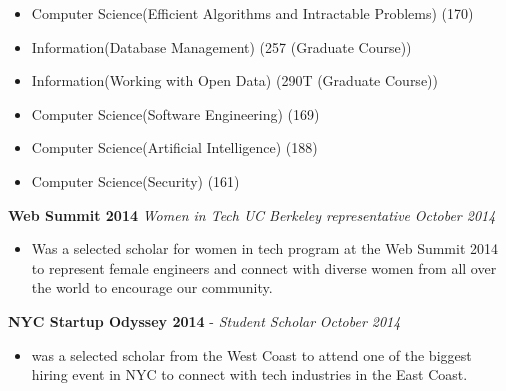 \documentclass[9pt]{extarticle}
\begin{document}
\begin{body}
\vspace{-11pt}
	
\begin{multicols}{3}
  \begin{itemize}
    \itemsep -2pt
    \item Computer Science(Efficient Algorithms and Intractable Problems) (170)
    \item Information(Database Management) (257 (Graduate Course))
    \item Information(Working with Open Data) (290T (Graduate Course))
    \item Computer Science(Software Engineering) (169)
    \item Computer Science(Artificial Intelligence) (188)
    \item Computer Science(Security) (161)
  \end{itemize}
\end{multicols}

\end{body}


\begin{body}

  \textbf{Web Summit 2014} 
  \emph{Women in Tech UC Berkeley representative}
  \hfill 
  \emph{October 2014}
  \begin{itemize}[label=\hfill]
  \item Was a selected scholar for women in tech program at the Web Summit 2014 to represent female engineers and connect with diverse women from all over the world to encourage our community.
  \end{itemize}

  \textbf{NYC Startup Odyssey 2014} - 
  \emph{Student Scholar} 
  \hfill 
  \emph{October 2014}\\
  \begin{itemize}[label=\hfill]
  \item was a selected scholar from the West Coast to attend one of the biggest hiring event in NYC to connect with tech industries in the East Coast.
  \end{itemize}


\end{body}
\end{document}
